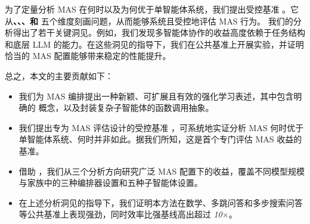
为了定量分析 MAS 在何时以及为何优于单智能体系统，我们提出受控基准 \ourbenchmark。它从\textbf{\depth、\horizon、\breadth、\myparallel 和 \robustness}五个维度刻画问题，从而能够系统且受控地评估 MAS 行为。
我们的分析得出了若干关键洞见。例如，我们发现多智能体协作的收益高度依赖于任务结构和底层 LLM 的能力。在这些洞见的指导下，我们在公共基准上开展实验，并证明恰当的 MAS 配置能够带来稳定的性能提升。

总之，本文的主要贡献如下：
\begin{itemize}[leftmargin=*,noitemsep,topsep=2pt]
  \item 我们为 MAS 编排提出一种新颖、可扩展且有效的强化学习表述，其中包含明确的 \textit{\masness} 概念，以及封装复杂子智能体的函数调用抽象。
  \item 我们提出专为 MAS 评估设计的受控基准 \ourbenchmark，可系统地实证分析 MAS 何时优于单智能体系统、何时并非如此。据我们所知，这是首个专门评估 MAS 收益的基准。
  \item 借助 \ourbenchmark，我们从三个分析方向研究广泛 MAS 配置下的收益，覆盖不同模型规模与家族中的三种编排器设置和五种子智能体设置。
  \item 在上述分析洞见的指导下，我们证明本方法在数学、多跳问答和多步搜索问答等公共基准上表现强劲，同时效率比强基线高出超过 \textit{10$\times$}。
\end{itemize}





